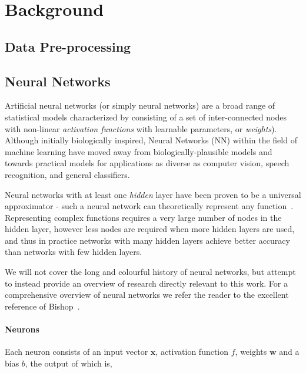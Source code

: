 \documentclass[thesis]{subfiles}
\begin{document}


\chapter{Background}
\label{background}

\section{Data Pre-processing}
\section{Neural Networks}
Artificial neural networks (or simply neural networks) are a broad range of statistical models characterized by consisting of a set of inter-connected nodes with non-linear \emph{activation functions} with learnable parameters, or \emph{weights}). Although initially biologically inspired, Neural Networks (NN) within the field of machine learning have moved away from biologically-plausible models and towards practical models for applications as diverse as computer vision, speech recognition, and general classifiers.

Neural networks with at least one \emph{hidden} layer have been proven to be a universal approximator - \ie such a neural network can theoretically represent any function~\cite{journals/mcss/Cybenko92,hornik89a}. Representing complex functions requires a very large number of nodes in the hidden layer, however less nodes are required when more hidden layers are used, and thus in practice networks with many hidden layers achieve better accuracy than networks with few hidden layers. 

We will not cover the long and colourful history of neural networks, but attempt to instead provide an overview of research directly relevant to this work. For a comprehensive overview of neural networks we refer the reader to the excellent reference of Bishop~\cite{Bishop1995}.

\subsubsection{Neurons}
Each neuron consists of an input vector $\mathbf{x}$, activation function $f$, weights $\mathbf{w}$ and a bias $b$, the output of which is,
\end{document}

